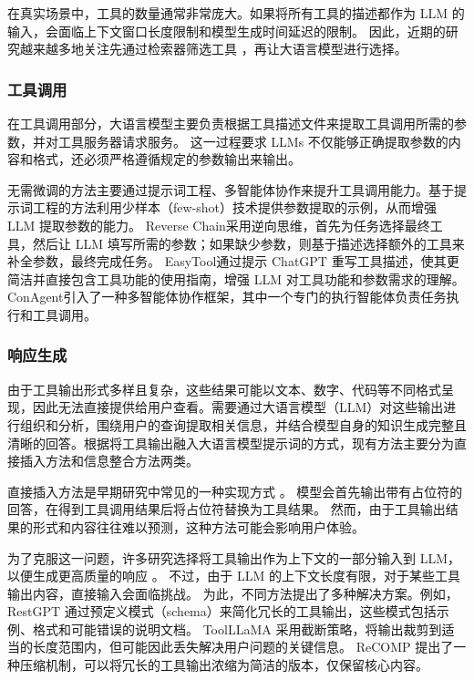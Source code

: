 在真实场景中，工具的数量通常非常庞大。如果将所有工具的描述都作为 LLM 的输入，会面临上下文窗口长度限制和模型生成时间延迟的限制。
因此，近期的研究越来越多地关注先通过检索器筛选工具\cite{Qin2023, anantha2023protip, Liu2024} ，再让大语言模型进行选择。

\subsubsection{工具调用}

在工具调用部分，大语言模型主要负责根据工具描述文件来提取工具调用所需的参数，并对工具服务器请求服务。
这一过程要求 LLMs 不仅能够正确提取参数的内容和格式，还必须严格遵循规定的参数输出来输出。

无需微调的方法主要通过提示词工程、多智能体协作来提升工具调用能力。基于提示词工程的方法利用少样本（few-shot）技术提供参数提取的示例，从而增强 LLM 提取参数的能力\cite{Song2023, Liu2023a, Liu2024, hsieh2023tool}。
Reverse Chain\cite{zhang2023reverse}采用逆向思维，首先为任务选择最终工具，然后让 LLM 填写所需的参数；如果缺少参数，则基于描述选择额外的工具来补全参数，最终完成任务。
EasyTool\cite{yuan2024easytool}通过提示 ChatGPT 重写工具描述，使其更简洁并直接包含工具功能的使用指南，增强 LLM 对工具功能和参数需求的理解。
ConAgent\cite{shi2024learning}引入了一种多智能体协作框架，其中一个专门的执行智能体负责任务执行和工具调用。

\subsubsection{响应生成}

由于工具输出形式多样且复杂，这些结果可能以文本、数字、代码等不同格式呈现，因此无法直接提供给用户查看。需要通过大语言模型（LLM）对这些输出进行组织和分析，围绕用户的查询提取相关信息，并结合模型自身的知识生成完整且清晰的回答。根据将工具输出融入大语言模型提示词的方式，现有方法主要分为直接插入方法和信息整合方法两类。

直接插入方法是早期研究中常见的一种实现方式 \cite{schick2024toolformer, wang2024tools, hao2024toolkengpt}。
模型会首先输出带有占位符的回答，在得到工具调用结果后将占位符替换为工具结果。
然而，由于工具输出结果的形式和内容往往难以预测，这种方法可能会影响用户体验。

为了克服这一问题，许多研究选择将工具输出作为上下文的一部分输入到 LLM，以便生成更高质量的响应 \cite{shen2024hugginggpt,}。
不过，由于 LLM 的上下文长度有限，对于某些工具输出内容，直接输入会面临挑战。
为此，不同方法提出了多种解决方案。例如，RestGPT \cite{Song2023} 通过预定义模式（schema）来简化冗长的工具输出，这些模式包括示例、格式和可能错误的说明文档。
ToolLLaMA \cite{Qin2023} 采用截断策略，将输出裁剪到适当的长度范围内，但可能因此丢失解决用户问题的关键信息。
ReCOMP \cite{xu2023recomp} 提出了一种压缩机制，可以将冗长的工具输出浓缩为简洁的版本，仅保留核心内容。

